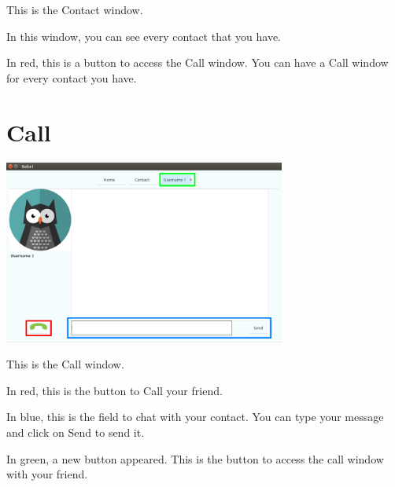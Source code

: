 \documentclass{article}
\begin{document}
  \bigskip
  This is the Contact window.

  \bigskip
  In this window, you can see every contact that you have.

  \bigskip
  In red, this is a button to access the Call window. You can have a Call window for every contact you have.

  \newpage
  \section{Call}
  \bigskip
  \includegraphics[width=350]{ownContactGuide}

  \bigskip
  This is the Call window.

  \bigskip
  In red, this is the button to Call your friend.

  \bigskip
  In blue, this is the field to chat with your contact. You can type your message and click on Send to send it.

  \bigskip
  In green, a new button appeared. This is the button to access the call window with your friend.
\end{document}
